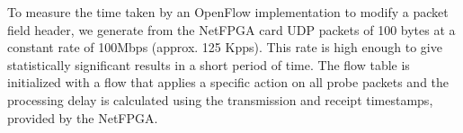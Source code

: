To measure the time taken by an OpenFlow implementation to modify a
packet field header, we generate from the NetFPGA card UDP packets of
100 bytes at a constant rate of 100Mbps (approx. 125 Kpps). 
This rate is high enough to give statistically significant results in
a short period of time. The flow table is initialized with a flow that
applies a specific action on all probe packets and the processing
delay is calculated using the transmission and receipt timestamps,
provided by the NetFPGA.
%
